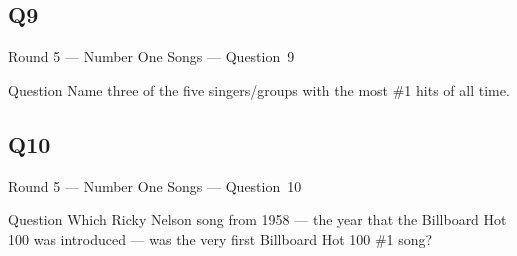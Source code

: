 \documentclass[11pt]{beamer}
\begin{document}
\subsection*{Q9}
\begin{frame}[t]{Round 5 --- Number One Songs --- \mbox{Question 9}}
\vspace{-0.5em}
\begin{block}{Question}
Name three of the five singers/groups with the most \#1 hits of all time.
\end{block}
\end{frame}
\subsection*{Q10}
\begin{frame}[t]{Round 5 --- Number One Songs --- \mbox{Question 10}}
\vspace{-0.5em}
\begin{block}{Question}
Which Ricky Nelson song from 1958 --- the year that the Billboard Hot 100 was introduced --- was the very first Billboard Hot 100 \#1 song?
\end{block}
\end{frame}
\end{document}
